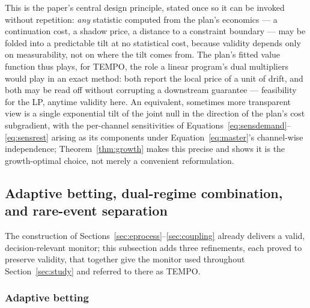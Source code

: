 \documentclass[trsc,dblanonrev]{informs4}
\begin{document}
This is the paper's central design principle, stated once so it can be
invoked without repetition: \emph{any} statistic computed from the
plan's economics --- a continuation cost, a shadow price, a distance
to a constraint boundary --- may be folded into a predictable tilt at
no statistical cost, because validity depends only on measurability,
not on where the tilt comes from. The plan's fitted value function
thus plays, for TEMPO, the role a linear program's dual multipliers
would play in an exact method: both report the local price of a unit
of drift, and both may be read off without corrupting a downstream
guarantee --- feasibility for the LP, anytime validity here. An
equivalent, sometimes more transparent view is a single exponential
tilt of the joint null in the direction of the plan's cost subgradient,
with the per-channel sensitivities of
Equations~\eqref{eq:sensdemand}--\eqref{eq:sensrest} arising as its
components under Equation~\eqref{eq:master}'s channel-wise
independence; Theorem~\ref{thm:growth} makes this precise and shows it
is the growth-optimal choice, not merely a convenient reformulation.

\subsection{Adaptive betting, dual-regime combination, and rare-event separation}\label{sec:tempoconstruct}

The construction of Sections~\ref{sec:eprocess}--\ref{sec:coupling}
already delivers a valid, decision-relevant monitor; this subsection
adds three refinements, each proved to preserve validity, that together
give the monitor used throughout Section~\ref{sec:study} and referred
to there as TEMPO.

\subsubsection{Adaptive betting}
\end{document}
